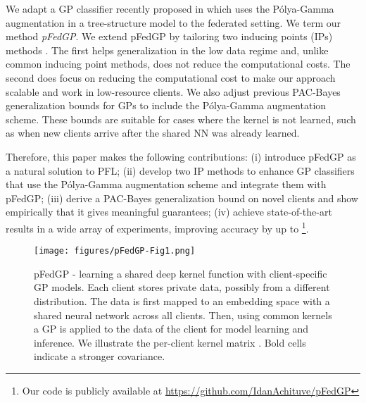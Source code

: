 \documentclass{article}
\newcommand{\pg}{P\'olya-Gamma }
\begin{document}
We adapt a GP classifier recently proposed in \cite{achituve2021gp_icml} which uses the \pg augmentation \cite{polya_gamma} in a tree-structure model to the federated setting. We term our method \textit{pFedGP}. We extend pFedGP by tailoring two inducing points (IPs) methods \cite{quinonero2005unifying, sneldon_Gharamani_IP}. The first helps generalization in the low data regime and, unlike common inducing point methods, does not reduce the computational costs. The second does focus on reducing the computational cost to make our approach scalable and work in low-resource clients. We also adjust previous PAC-Bayes generalization bounds for GPs \cite{reeb2018learning, seeger2002pac} to include the \pg augmentation scheme. These bounds are suitable for cases where the kernel is not learned, such as when new clients arrive after the shared NN was already learned.

Therefore, this paper makes the following contributions: (i) introduce pFedGP as a natural solution to PFL; (ii) develop two IP methods to enhance GP classifiers that use the \pg augmentation scheme and integrate them with pFedGP; (iii) derive a PAC-Bayes generalization bound on novel clients and show empirically that it gives meaningful guarantees; (iv) achieve state-of-the-art results in a wide array of experiments, improving accuracy by up to  \footnote{Our code is publicly available at \textcolor{magenta}{\url{https://github.com/IdanAchituve/pFedGP}}}.



\begin{figure*}[!t]
\centering
    \texttt{[image: figures/pFedGP-Fig1.png]}
    \caption{pFedGP - learning a shared deep kernel function with client-specific GP models. Each client stores private data, possibly from a different distribution. The data is first mapped to an embedding space with a shared neural network across all clients. Then, using common kernels a GP is applied to the data of the client for model learning and inference. We illustrate the per-client kernel matrix . Bold cells indicate a stronger covariance.}
    \label{fig:gp_sys}
\end{figure*}
\end{document}
